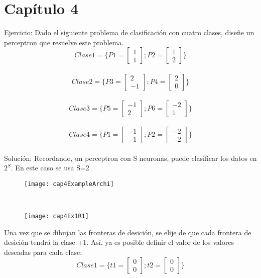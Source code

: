 \documentclass{article}
\begin{document}
\part{Capítulo 4}
Ejercicio: Dado el siguiente problema de clasificación con cuatro clases, diseñe un perceptron que resuelve este problema.
\[Clase 1 = \{ P1 =
\begin{bmatrix}
1\\
1
\end{bmatrix};
P2 = 
\begin{bmatrix}
1\\
2
\end{bmatrix}
\}
\]\\

\[Clase 2 = \{ P3 =
\begin{bmatrix}
2\\
-1
\end{bmatrix};
P4 = 
\begin{bmatrix}
2\\
0
\end{bmatrix}
\}
\]\\

\[Clase 3 = \{ P5 =
\begin{bmatrix}
-1\\
2
\end{bmatrix};
P6 = 
\begin{bmatrix}
-2\\
1
\end{bmatrix}
\}
\]\\

\[Clase 4= \{ P1 =
\begin{bmatrix}
-1\\
-1
\end{bmatrix};
P2 = 
\begin{bmatrix}
-2\\
-2
\end{bmatrix}
\}
\]\\
Solución:
Recordando, un perceptron con S neuronas, puede clasificar los datos en $2^S$. En este caso se usa S=2\\
\begin{figure}[h!]
	\centering
	\texttt{[image: cap4ExampleArchi]}
\end{figure}\\

\begin{figure}[h!]
	\centering
	\texttt{[image: cap4Ex1R1]}
\end{figure}

Una vez que se dibujan las fronteras de desición, se elije de que cada frontera de desición tendrá la clase +1. Así, ya es posible definir el valor de los valores deseadas para cada clase:\\
\[Clase 1 = \{ t1 =
\begin{bmatrix}
0\\
0
\end{bmatrix};
t2 = 
\begin{bmatrix}
0\\
0
\end{bmatrix}
\}
\]\\
\end{document}
